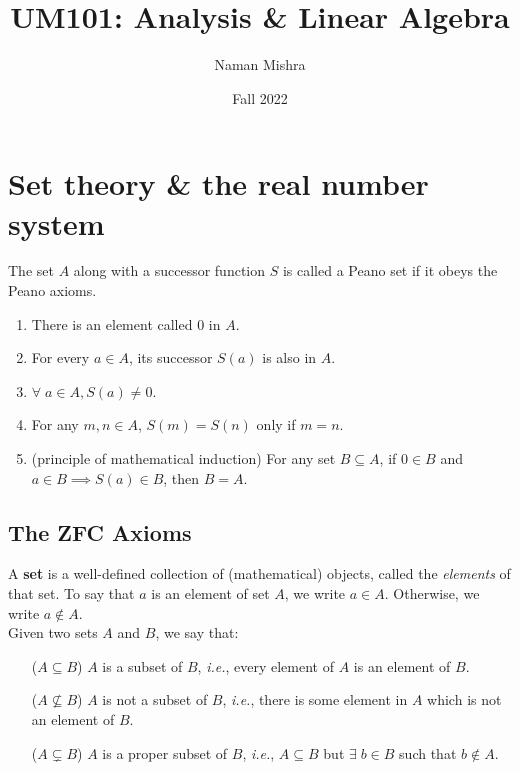 \documentclass[12pt]{article}
\title{UM101: Analysis \& Linear Algebra}
\author{Naman Mishra}
\date{Fall 2022}
\begin{document}
\maketitle
\tableofcontents

\section{Set theory \& the real number system}

\begin{defn} \label{defn:peano set}
    The set $A$ along with a successor function $S$ is called a Peano set if it obeys the Peano axioms.
    \begin{enumerate}[label=(P\arabic*)]
        \item \label{peano:zero}
            There is an element called 0 in $A$.
        \item \label{peano:succ}
            For every $a \in A$, its successor $S(a)$ is also in $A$.
        \item \label{peano:not succ}
            $\forall \; a \in A, S(a) \neq 0$.
        \item \label{peano:injective}
            For any $m, n \in A$, $S(m) = S(n)$ only if $m = n$.
        \item \label{peano:induction}
            (principle of mathematical induction) For any set $B \subseteq A$, if $0 \in B$ and $a \in B \implies S(a) \in B$, then $B = A$.
    \end{enumerate}
\end{defn}

\subsection{The ZFC Axioms}

\begin{defn} \label{defn:set}
    A \textbf{set} is a well-defined collection of (mathematical) objects, called the \emph{elements} of that set. To say that $a$ is an element of set $A$, we write $a \in A$. Otherwise, we write $a \notin A$. \\
    Given two sets $A$ and $B$, we say that:
    \begin{enumerate}
        \item[($A \subseteq B$)] $A$ is a subset of $B$, \textit{i.e.}, every element of $A$ is an element of $B$.
        \item[($A \not\subseteq B$)] $A$ is not a subset of $B$, \textit{i.e.}, there is some element in $A$ which is not an element of $B$.
        \item[($A \subsetneq B$)] $A$ is a proper subset of $B$, \textit{i.e.}, $A \subseteq B$ but $\exists\; b \in B$ such that $b \notin A$.
    \end{enumerate}
\end{defn}
\end{document}
